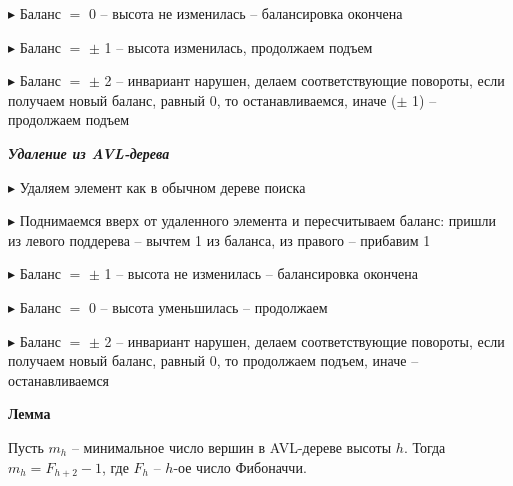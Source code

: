 $\blacktriangleright$ Баланс $=$ 0 – высота не изменилась – балансировка
окончена

$\blacktriangleright$ Баланс $=$ $\pm$ 1 – высота изменилась, продолжаем подъем

$\blacktriangleright$ Баланс $=$ $\pm$ 2 – инвариант нарушен, делаем
соответствующие повороты, если получаем новый баланс,
равный 0, то останавливаемся, иначе ($\pm$ 1) – продолжаем
подъем 


\textbf{\textit{Удаление из AVL-дерева}}

$\blacktriangleright$  Удаляем элемент как в обычном дереве поиска

$\blacktriangleright$  Поднимаемся вверх от удаленного элемента и
пересчитываем баланс: пришли из левого поддерева –
вычтем 1 из баланса, из правого – прибавим 1

$\blacktriangleright$  Баланс $=$ $\pm$ 1 – высота не изменилась – балансировка
окончена

$\blacktriangleright$  Баланс $=$ 0 – высота уменьшилась – продолжаем

$\blacktriangleright$  Баланс $=$ $\pm$ 2 – инвариант нарушен, делаем
соответствующие повороты, если получаем новый баланс,
равный 0, то продолжаем подъем, иначе -- останавливаемся


\textbf{Лемма}

Пусть $m_h$ -- минимальное число вершин в AVL-дереве высоты
$h$. 
Тогда $m_h = F_{h+2} - 1$, где $F_h$ -- $h$-ое число Фибоначчи.

\pagebreak

